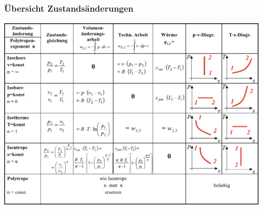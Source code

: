 \begin{frame}
  \frametitle{\"Ubersicht Zustands\"anderungen}
  \includegraphics[width=0.90\linewidth]{./ch01.basics/pics/zustandsaenderung}
  \ifteacher%
  \else%
    \vspace*{-0.10\baselineskip}\rotatebox[origin=lB]{180}{%
    \resizebox{0.9\linewidth}{!}{\parbox[t]{3.95\linewidth}{%
      \ %
    }}}
  \fi%



\end{frame}

